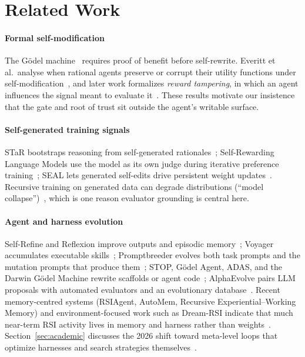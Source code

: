 \documentclass[11pt,a4paper]{article}
\begin{document}
\section{Related Work}

\paragraph{Formal self-modification} The G\"odel machine~\cite{godel} requires proof of benefit before self-rewrite. Everitt et al.\ analyse when rational agents preserve or corrupt their utility functions under self-modification~\cite{everitt-selfmod}, and later work formalizes \emph{reward tampering}, in which an agent influences the signal meant to evaluate it~\cite{reward-tampering}. These results motivate our insistence that the gate and root of trust sit outside the agent's writable surface.

\paragraph{Self-generated training signals} STaR bootstraps reasoning from self-generated rationales~\cite{star}; Self-Rewarding Language Models use the model as its own judge during iterative preference training~\cite{selfreward}; SEAL lets generated self-edits drive persistent weight updates~\cite{seal}. Recursive training on generated data can degrade distributions (``model collapse'')~\cite{collapse}, which is one reason evaluator grounding is central here.

\paragraph{Agent and harness evolution} Self-Refine and Reflexion improve outputs and episodic memory~\cite{selfrefine,reflexion}; Voyager accumulates executable skills~\cite{voyager}; Promptbreeder evolves both task prompts and the mutation prompts that produce them~\cite{promptbreeder}; STOP, G\"odel Agent, ADAS, and the Darwin G\"odel Machine rewrite scaffolds or agent code~\cite{stop,godelagent,adas,dgm}; AlphaEvolve pairs LLM proposals with automated evaluators and an evolutionary database~\cite{alphaevolve}. Recent memory-centred systems (RSIAgent, AutoMem, Recursive Experiential--Working Memory) and environment-focused work such as Dream-RSI indicate that much near-term RSI activity lives in memory and harness rather than weights~\cite{rsiagent,automem,recuris,dreamrsi}. Section~\ref{sec:academic} discusses the 2026 shift toward meta-level loops that optimize harnesses and search strategies themselves~\cite{metaharness,hyperagents,evox}.
\end{document}
